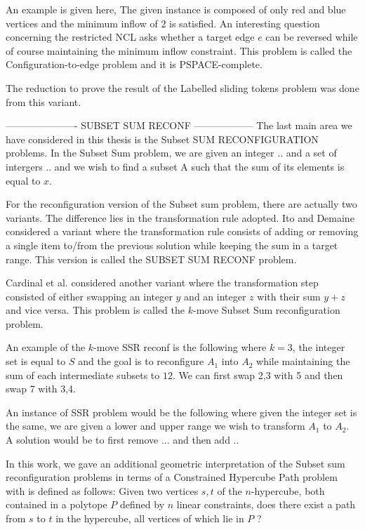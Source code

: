An example is given here, The given instance is composed of only red and blue vertices and the minimum inflow of 2 is satisfied. 
An interesting question concerning the restricted NCL asks whether a target edge $e$ can be reversed while of course maintaining the minimum inflow constraint. This problem is called the Configuration-to-edge problem and it is  PSPACE-complete.  

The reduction to prove the result of the Labelled sliding tokens problem was done from this variant. 


---------------------- SUBSET SUM RECONF ------------------
The last main area we have considered in this thesis is the Subset SUM RECONFIGURATION problems. In the Subset Sum problem, we are given an integer .. and a set of intergers .. and we wish to find a subset A such that the sum of its elements is equal to $x$. 

For the reconfiguration version of the Subset sum problem, there are actually two variants. The difference lies in the transformation rule adopted. Ito and Demaine considered a variant where the transformation rule consists of adding or removing a single item to/from the previous solution while keeping the sum in a target range. This version is called the SUBSET SUM RECONF problem. 

Cardinal et al. considered another variant where the transformation step consisted of either swapping an integer $y$ and an integer $z$ with their sum $y + z$ and vice versa. This problem is called the $k$-move Subset Sum reconfiguration problem. 

An example of the $k$-move SSR reconf is the following where $k = 3$, the integer set is equal to $S$ and the goal is to reconfigure $A_1$ into $A_2$ while maintaining the sum of each intermediate subsets to $12$. We can first swap 2,3 with 5 and then swap 7 with 3,4.

An instance of SSR problem would be the following where given the integer set is the same, we are given a lower and upper range we wish to transform $A_1$ to $A_2$. A solution would be to first remove ... and then add .. 

In this work, we gave an additional geometric interpretation of the Subset sum reconfiguration problems in terms of a Constrained Hypercube Path problem with is defined as follows: 
Given two vertices $s,t$ of the $n$-hypercube, both contained in a polytope $P$ defined by $n$ linear constraints, does there exist a path from $s$ to $t$ in the hypercube, all vertices of which lie in $P$ ?  

